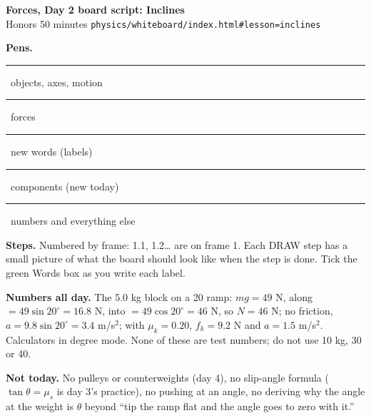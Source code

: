 \documentclass[10.5pt]{article}
\newcommand{\pen}[2]{\textcolor{#1}{\rule{8pt}{8pt}}\ #2}
\begin{document}
\begin{center}{\Large\bfseries Forces, Day 2 board script: Inclines}\\[2pt]{\normalsize Honors \textbullet{} 50 minutes \textbullet{} \texttt{physics/whiteboard/index.html\#lesson=inclines}}\end{center}
\noindent\textbf{Pens.} \pen{pblue}{objects, axes, motion} \quad \pen{pred}{forces} \quad \pen{pgreen}{new words (labels)} \quad \pen{ppurple}{components (new today)} \quad \pen{black}{numbers and everything else}\par
\noindent\textbf{Steps.} Numbered by frame: 1.1, 1.2\ldots{} are on frame 1. Each DRAW step has a small picture of what the board should look like when the step is done. Tick the green Words box as you write each label.\par
\noindent\textbf{Numbers all day.} The 5.0 kg block on a 20\textdegree{} ramp: $mg = 49$ N, along $= 49\sin 20^\circ = 16.8$ N, into $= 49\cos 20^\circ = 46$ N, so $N = 46$ N; no friction, $a = 9.8 \sin 20^\circ = 3.4$ m/s$^2$; with $\mu_k = 0.20$, $f_k = 9.2$ N and $a = 1.5$ m/s$^2$. Calculators in degree mode. None of these are test numbers; do not use 10 kg, 30\textdegree{} or 40\textdegree.\par
\noindent\textbf{Not today.} No pulleys or counterweights (day 4), no slip-angle formula ($\tan\theta = \mu_s$ is day 3's practice), no pushing at an angle, no deriving why the angle at the weight is $\theta$ beyond ``tip the ramp flat and the angle goes to zero with it.''\par\smallskip
\noindent{}\par\medskip
\end{document}
